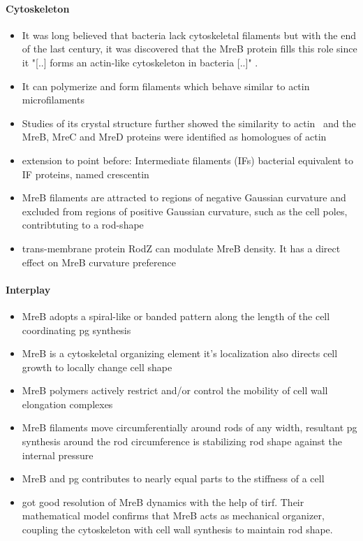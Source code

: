 \documentclass{article}
\begin{document}
\paragraph{Cytoskeleton}
\begin{itemize}
    \item It was long believed that bacteria lack cytoskeletal filaments but with the end of the last century, it was discovered that the MreB protein fills this role since it "[..] forms an actin-like cytoskeleton in bacteria [..]" \cite{Erickson2001}.
    \item \cite{Dersch2020} It can polymerize and form filaments which behave similar to actin microfilaments 
    \item \cite{Lowe2017_lj} Studies of its crystal structure further showed the similarity to actin~\cite{vandenEnt2001} and the MreB, MreC and MreD proteins were identified as homologues of actin 
    \item \cite{Ausmees2003} extension to point before: Intermediate filaments (IFs) bacterial equivalent to IF proteins, named crescentin
    \item \cite{vanTeeffelen2018} MreB filaments are attracted to regions of negative Gaussian curvature and excluded from regions of positive Gaussian curvature, such as the cell poles, contribtuting to a rod-shape
    \item \cite{Bratton2018} trans-membrane protein RodZ can modulate MreB density. It has a direct effect on MreB curvature preference
\end{itemize}

\paragraph{Interplay}
\begin{itemize}
    \item \cite{White2012} \cite{López2006} MreB adopts a spiral-like or banded pattern along the length of the cell coordinating \ac{pg} synthesis  
    \item \cite{Shi2018} MreB is a cytoskeletal organizing element it's localization also directs cell growth to locally change cell shape 
    \item \cite{DEscobar2011} MreB polymers actively restrict and/or control the mobility of cell wall elongation complexes
    \item  \cite{Shi2018} MreB filaments move circumferentially around rods \cite{Garner2021} of any width, resultant \ac{pg} synthesis around the rod circumference is stabilizing rod shape against the internal pressure
    \item \cite{Wang2010, Wang2010_protocol} MreB and \ac{pg} contributes to nearly equal parts to the stiffness of a cell
    \item \cite{Olshausen2013} got good resolution of MreB dynamics with the help of \ac{tirf}. Their mathematical model confirms that MreB acts as mechanical organizer, coupling the cytoskeleton with cell wall synthesis to maintain rod shape.
\end{itemize}
\end{document}
